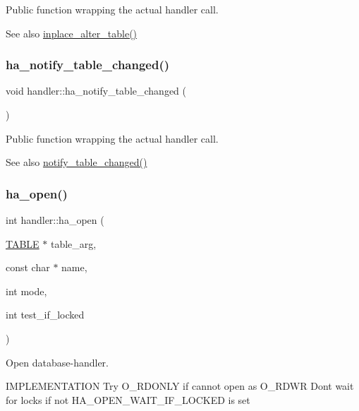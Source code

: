 Public function wrapping the actual handler call. \begin{DoxySeeAlso}{See also}
\mbox{\hyperlink{classhandler_a90b4c3a8fe1c89c6ccfec1f4b144754a}{inplace\+\_\+alter\+\_\+table()}} 
\end{DoxySeeAlso}
\mbox{\label{classhandler_a5b81b74b0b7b87de4f99ebe20c49dc44}} 
\subsubsection{\texorpdfstring{ha\+\_\+notify\+\_\+table\+\_\+changed()}{ha\_notify\_table\_changed()}}
{\footnotesize\ttfamily void handler\+::ha\+\_\+notify\+\_\+table\+\_\+changed (\begin{DoxyParamCaption}{ }\end{DoxyParamCaption})\hspace{0.3cm}{\ttfamily [inline]}}

Public function wrapping the actual handler call. \begin{DoxySeeAlso}{See also}
\mbox{\hyperlink{classhandler_a26aaaf2105e60ca590b79fae82e48960}{notify\+\_\+table\+\_\+changed()}} 
\end{DoxySeeAlso}
\mbox{\label{classhandler_ab5e02829386929734724b143391e0a11}} 
\subsubsection{\texorpdfstring{ha\+\_\+open()}{ha\_open()}}
{\footnotesize\ttfamily int handler\+::ha\+\_\+open (\begin{DoxyParamCaption}\item[{\mbox{\hyperlink{structTABLE}{T\+A\+B\+LE}} $\ast$}]{table\+\_\+arg,  }\item[{const char $\ast$}]{name,  }\item[{int}]{mode,  }\item[{int}]{test\+\_\+if\+\_\+locked }\end{DoxyParamCaption})}



Open database-\/handler. 

I\+M\+P\+L\+E\+M\+E\+N\+T\+A\+T\+I\+ON Try O\+\_\+\+R\+D\+O\+N\+LY if cannot open as O\+\_\+\+R\+D\+WR Don\textquotesingle{}t wait for locks if not H\+A\+\_\+\+O\+P\+E\+N\+\_\+\+W\+A\+I\+T\+\_\+\+I\+F\+\_\+\+L\+O\+C\+K\+ED is set \mbox{\label{classhandler_a980a8a7650a41fd9a05a32521826ccd5}} 
